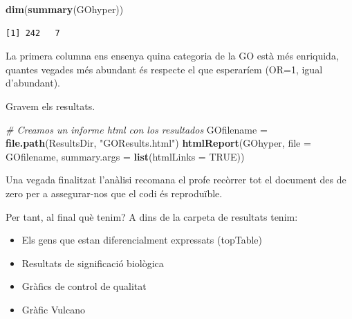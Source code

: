 \documentclass[
]{article}
\newenvironment{Shaded}{\begin{snugshade}}{\end{snugshade}}
\newcommand{\AttributeTok}[1]{\textcolor[rgb]{0.13,0.29,0.53}{#1}}
\newcommand{\CommentTok}[1]{\textcolor[rgb]{0.56,0.35,0.01}{\textit{#1}}}
\newcommand{\ConstantTok}[1]{\textcolor[rgb]{0.56,0.35,0.01}{#1}}
\newcommand{\FunctionTok}[1]{\textcolor[rgb]{0.13,0.29,0.53}{\textbf{#1}}}
\newcommand{\NormalTok}[1]{#1}
\newcommand{\OtherTok}[1]{\textcolor[rgb]{0.56,0.35,0.01}{#1}}
\newcommand{\StringTok}[1]{\textcolor[rgb]{0.31,0.60,0.02}{#1}}
\begin{document}
\begin{Shaded}
\begin{Highlighting}[]
\FunctionTok{dim}\NormalTok{(}\FunctionTok{summary}\NormalTok{(GOhyper))}
\end{Highlighting}
\end{Shaded}

\begin{verbatim}
[1] 242   7
\end{verbatim}

La primera columna ens ensenya quina categoria de la GO està més
enriquida, quantes vegades més abundant és respecte el que esperaríem
(OR=1, igual d'abundant).

Gravem els resultats.

\begin{Shaded}
\begin{Highlighting}[]
\CommentTok{\# Creamos un informe html con los resultados}
\NormalTok{GOfilename }\OtherTok{=} \FunctionTok{file.path}\NormalTok{(ResultsDir, }\StringTok{"GOResults.html"}\NormalTok{)}
\FunctionTok{htmlReport}\NormalTok{(GOhyper, }\AttributeTok{file =}\NormalTok{ GOfilename, }\AttributeTok{summary.args =} \FunctionTok{list}\NormalTok{(}\AttributeTok{htmlLinks =} \ConstantTok{TRUE}\NormalTok{))}
\end{Highlighting}
\end{Shaded}

Una vegada finalitzat l'anàlisi recomana el profe recòrrer tot el
document des de zero per a assegurar-nos que el codi és reproduïble.

Per tant, al final què tenim? A dins de la carpeta de resultats tenim:

\begin{itemize}
\item
  Els gens que estan diferencialment expressats (topTable)
\item
  Resultats de significació biològica
\item
  Gràfics de control de qualitat
\item
  Gràfic Vulcano
\end{itemize}
\end{document}
